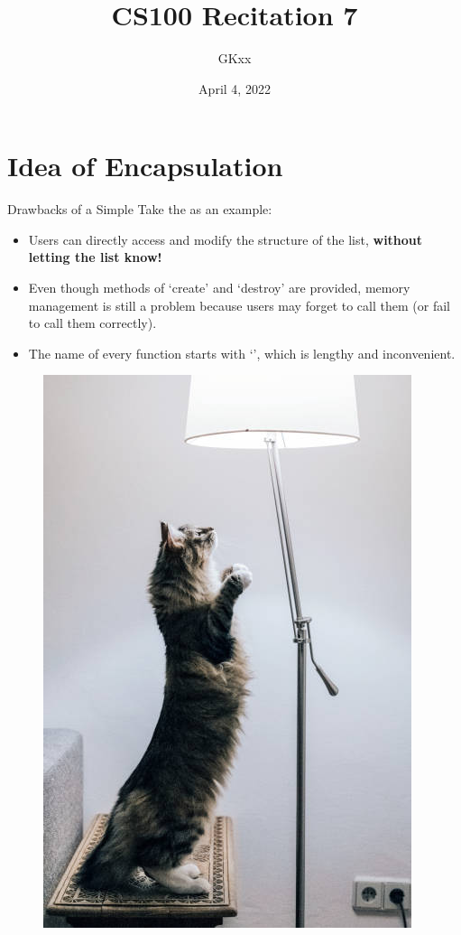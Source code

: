 \documentclass{beamer}
\title{CS100 Recitation 7}
\author{GKxx}
\date{April 4, 2022}
\begin{document}
\begin{frame}
    \maketitle
\end{frame}

\section{Idea of Encapsulation}

\begin{frame}{Drawbacks of a Simple \struct}
    Take the  as an example:
    \begin{itemize}
        \item Users can directly access and modify the structure of the list, \textbf{without letting the list know!}
        \item Even though methods of `create' and `destroy' are provided, memory management is still a problem because users may forget to call them (or fail to call them correctly).
        \item The name of every function starts with `', which is lengthy and inconvenient.
    \end{itemize}
\end{frame}

\begin{frame}
    \begin{figure}[h]
        \centering
        \includegraphics[height=0.9\textheight]{figures/lamp.jpg}
    \end{figure}
\end{frame}
\end{document}

